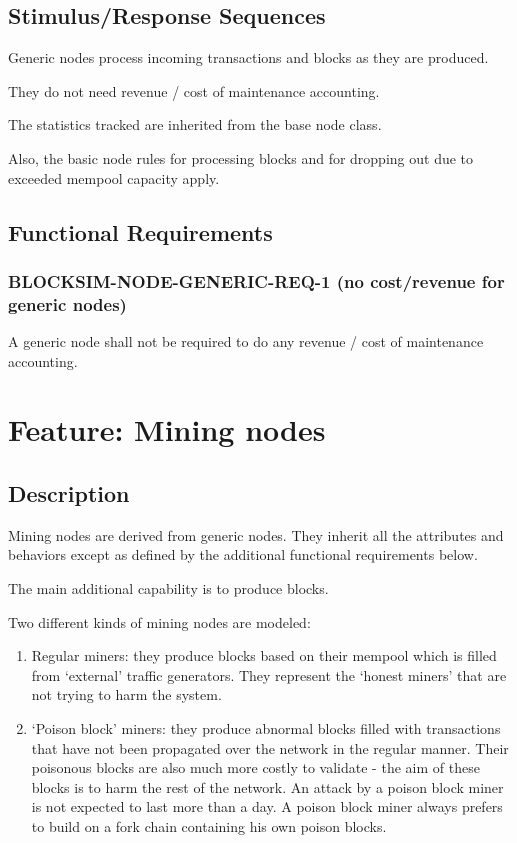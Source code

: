 \documentclass{scrreprt}
\begin{document}
\subsection{Stimulus/Response Sequences}

Generic nodes process incoming transactions and blocks as they are
produced.

They do not need revenue / cost of maintenance accounting.

The statistics tracked are inherited from the base node class.

Also, the basic node rules for processing blocks and for dropping out due to
exceeded mempool capacity apply.


\subsection{Functional Requirements}

\subsubsection{BLOCKSIM-NODE-GENERIC-REQ-1 (no cost/revenue for generic nodes)}

A generic node shall not be required to do any revenue / cost of maintenance accounting.



\section{Feature: Mining nodes}

\subsection{Description}

Mining nodes are derived from generic nodes. They inherit all the
attributes and behaviors except as defined by the additional functional
requirements below.

The main additional capability is to produce blocks.

Two different kinds of mining nodes are modeled:

\begin{enumerate}
   \item Regular miners: they produce blocks based on their mempool which is filled from `external' traffic generators. They represent the `honest miners' that are not trying to harm the system.
   \item `Poison block' miners: they produce abnormal blocks filled with transactions that have not been propagated over the network in the regular manner. Their poisonous blocks are also much more costly to validate - the aim of these blocks is to harm the rest of the network. An attack by a poison block miner is not expected to last more than a day. A poison block miner always prefers to build on a fork chain containing his own poison blocks.
\end{enumerate}
\end{document}
